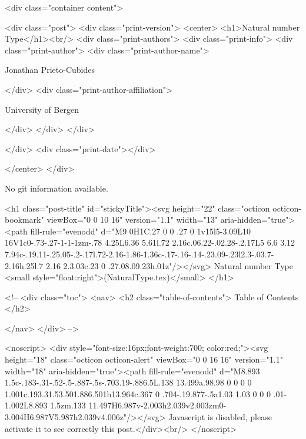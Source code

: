       <div class="container content">
        







<div class="post">
  <div class="print-version">
    <center>
      <h1>Natural number Type</h1><br/>
        <div class="print-authors">
          <div class="print-info">
            <div class="print-author">
              <div class="print-author-name">
                
                  Jonathan Prieto-Cubides
                
              </div>
              <div class="print-author-affiliation">
                
                  University of Bergen
                
                </div>
            </div>
          </div>
          
          
        </div>
        <div class="print-date"></div>
        
        
    </center>
  </div>

  
  No git information available.
  

  <h1 class="post-title" id="stickyTitle"><svg height="22" class="octicon octicon-bookmark" viewBox="0 0 10 16" version="1.1" width="13" aria-hidden="true"><path fill-rule="evenodd" d="M9 0H1C.27 0 0 .27 0 1v15l5-3.09L10 16V1c0-.73-.27-1-1-1zm-.78 4.25L6.36 5.61l.72 2.16c.06.22-.02.28-.2.17L5 6.6 3.12 7.94c-.19.11-.25.05-.2-.17l.72-2.16-1.86-1.36c-.17-.16-.14-.23.09-.23l2.3-.03.7-2.16h.25l.7 2.16 2.3.03c.23 0 .27.08.09.23h.01z"/></svg> Natural number Type <small style="float:right">(NaturalType.tex)</small>
  </h1>

  <!-- 
  <div class="toc">
    <nav>
    <h2 class="table-of-contents"> Table of Contents </h2>
      

    </nav>
  </div>
   -->

  <noscript>
  <div style="font-size:16px;font-weight:700; color:red;"><svg height="18" class="octicon octicon-alert" viewBox="0 0 16 16" version="1.1" width="18" aria-hidden="true"><path fill-rule="evenodd" d="M8.893 1.5c-.183-.31-.52-.5-.887-.5s-.703.19-.886.5L.138 13.499a.98.98 0 0 0 0 1.001c.193.31.53.501.886.501h13.964c.367 0 .704-.19.877-.5a1.03 1.03 0 0 0 .01-1.002L8.893 1.5zm.133 11.497H6.987v-2.003h2.039v2.003zm0-3.004H6.987V5.987h2.039v4.006z"/></svg> Javascript is disabled, please activate it to see correctly this post.</div><br/>
  </noscript>


